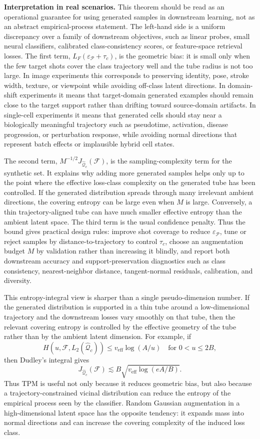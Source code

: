 \documentclass[preprint,12pt,number]{elsarticle}
\begin{document}
\textbf{Interpretation in real scenarios.}
This theorem should be read as an operational guarantee for using generated samples in downstream learning, not as an abstract empirical-process statement. The left-hand side is a uniform discrepancy over a family of downstream objectives, such as linear probes, small neural classifiers, calibrated class-consistency scores, or feature-space retrieval losses. The first term, $L_F(\varepsilon_{\mathcal{P}}+\tau_c)$, is the geometric bias: it is small only when the few target shots cover the class trajectory well and the tube radius is not too large. In image experiments this corresponds to preserving identity, pose, stroke width, texture, or viewpoint while avoiding off-class latent directions. In domain-shift experiments it means that target-domain generated examples should remain close to the target support rather than drifting toward source-domain artifacts. In single-cell experiments it means that generated cells should stay near a biologically meaningful trajectory such as pseudotime, activation, disease progression, or perturbation response, while avoiding normal directions that represent batch effects or implausible hybrid cell states.

The second term, $M^{-1/2}J_{\widehat{\mathcal{Q}}_c}(\mathcal{F})$, is the sampling-complexity term for the synthetic set. It explains why adding more generated samples helps only up to the point where the effective loss-class complexity on the generated tube has been controlled. If the generated distribution spreads through many irrelevant ambient directions, the covering entropy can be large even when $M$ is large. Conversely, a thin trajectory-aligned tube can have much smaller effective entropy than the ambient latent space. The third term is the usual confidence penalty. Thus the bound gives practical design rules: improve shot coverage to reduce $\varepsilon_{\mathcal{P}}$, tune or reject samples by distance-to-trajectory to control $\tau_c$, choose an augmentation budget $M$ by validation rather than increasing it blindly, and report both downstream accuracy and support-preservation diagnostics such as class consistency, nearest-neighbor distance, tangent-normal residuals, calibration, and diversity.

This entropy-integral view is sharper than a single pseudo-dimension number. If the generated distribution is supported in a thin tube around a low-dimensional trajectory and the downstream losses vary smoothly on that tube, then the relevant covering entropy is controlled by the effective geometry of the tube rather than by the ambient latent dimension. For example, if
\[
	H(u,\mathcal{F},L_2(\widehat{\mathcal{Q}}_c))
	\le
	v_{\mathrm{eff}}\log(A/u)
	\quad\text{for }0<u\le 2B,
\]
then Dudley's integral gives
\[
	J_{\widehat{\mathcal{Q}}_c}(\mathcal{F})
	\lesssim
	B\sqrt{v_{\mathrm{eff}}\log(eA/B)}.
\]
Thus TPM is useful not only because it reduces geometric bias, but also because a trajectory-constrained vicinal distribution can reduce the entropy of the empirical process seen by the classifier. Random Gaussian augmentation in a high-dimensional latent space has the opposite tendency: it expands mass into normal directions and can increase the covering complexity of the induced loss class.
\end{document}
